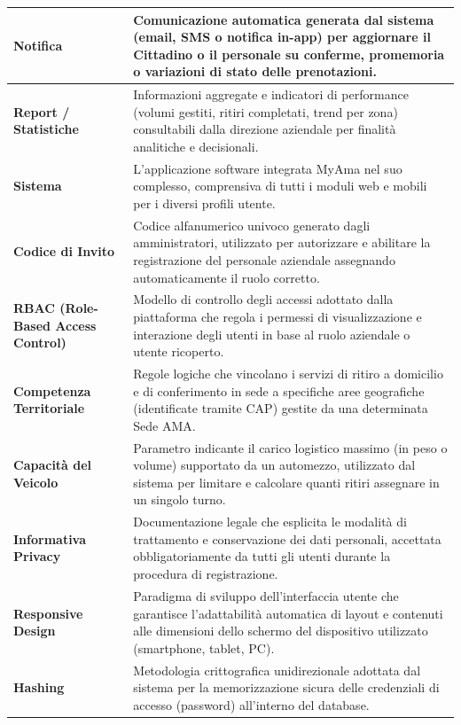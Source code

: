 \begin{center}
\begin{longtable}{|p{4.5cm}|p{11cm}|}
\textbf{Notifica} & Comunicazione automatica generata dal sistema (email, SMS o notifica in-app) per aggiornare il Cittadino o il personale su conferme, promemoria o variazioni di stato delle prenotazioni. \\ \hline

\textbf{Report / Statistiche} & Informazioni aggregate e indicatori di performance (volumi gestiti, ritiri completati, trend per zona) consultabili dalla direzione aziendale per finalità analitiche e decisionali. \\ \hline

\textbf{Sistema} & L'applicazione software integrata MyAma nel suo complesso, comprensiva di tutti i moduli web e mobili per i diversi profili utente. \\ \hline

\textbf{Codice di Invito} & Codice alfanumerico univoco generato dagli amministratori, utilizzato per autorizzare e abilitare la registrazione del personale aziendale assegnando automaticamente il ruolo corretto. \\ \hline

\textbf{RBAC (Role-Based Access Control)} & Modello di controllo degli accessi adottato dalla piattaforma che regola i permessi di visualizzazione e interazione degli utenti in base al ruolo aziendale o utente ricoperto. \\ \hline

\textbf{Competenza Territoriale} & Regole logiche che vincolano i servizi di ritiro a domicilio e di conferimento in sede a specifiche aree geografiche (identificate tramite CAP) gestite da una determinata Sede AMA. \\ \hline

\textbf{Capacità del Veicolo} & Parametro indicante il carico logistico massimo (in peso o volume) supportato da un automezzo, utilizzato dal sistema per limitare e calcolare quanti ritiri assegnare in un singolo turno. \\ \hline

\textbf{Informativa Privacy} & Documentazione legale che esplicita le modalità di trattamento e conservazione dei dati personali, accettata obbligatoriamente da tutti gli utenti durante la procedura di registrazione. \\ \hline

\textbf{Responsive Design} & Paradigma di sviluppo dell'interfaccia utente che garantisce l'adattabilità automatica di layout e contenuti alle dimensioni dello schermo del dispositivo utilizzato (smartphone, tablet, PC). \\ \hline

\textbf{Hashing} & Metodologia crittografica unidirezionale adottata dal sistema per la memorizzazione sicura delle credenziali di accesso (password) all'interno del database. \\ \hline
\end{longtable}
\end{center}
